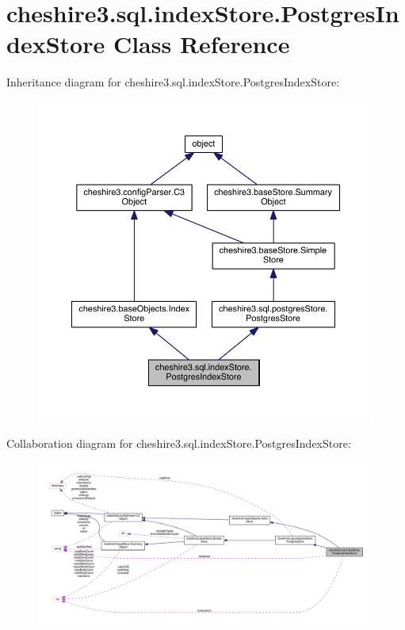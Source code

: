 \hypertarget{classcheshire3_1_1sql_1_1index_store_1_1_postgres_index_store}{\section{cheshire3.\-sql.\-index\-Store.\-Postgres\-Index\-Store Class Reference}
\label{classcheshire3_1_1sql_1_1index_store_1_1_postgres_index_store}
}


Inheritance diagram for cheshire3.\-sql.\-index\-Store.\-Postgres\-Index\-Store\-:
\nopagebreak
\begin{figure}[H]
\begin{center}
\leavevmode
\includegraphics[width=350pt]{classcheshire3_1_1sql_1_1index_store_1_1_postgres_index_store__inherit__graph}
\end{center}
\end{figure}


Collaboration diagram for cheshire3.\-sql.\-index\-Store.\-Postgres\-Index\-Store\-:
\nopagebreak
\begin{figure}[H]
\begin{center}
\leavevmode
\includegraphics[width=350pt]{classcheshire3_1_1sql_1_1index_store_1_1_postgres_index_store__coll__graph}
\end{center}
\end{figure}
